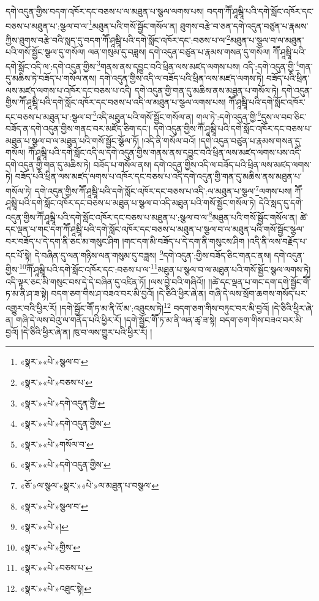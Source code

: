 དགེ་འདུན་གྱིས་བདག་འཁོར་དང་བཅས་པ་ལ་མཐུན་པ་སྩལ་ལགས་པས། བདག་ཀཽ་ཤཱམྦཱི་པའི་དགེ་སློང་འཁོར་དང་བཅས་པ་མཐུན་པ་:སྩལ་བ་ལ་\footnote{«སྣར་»«པེ་»སྩལ་བ་}མཐུན་པའི་གསོ་སྦྱོང་གསོལ་ན། ཐུགས་བརྩེ་བ་ཅན་དགེ་འདུན་བཙུན་པ་རྣམས་ཀྱིས་ཐུགས་བརྩེ་བའི་སླད་དུ་བདག་ཀཽ་ཤཱམྦཱི་པའི་དགེ་སློང་འཁོར་དང་:བཅས་པ་ལ་\footnote{«སྣར་»«པེ་»བཅས་པ་}མཐུན་པ་སྩལ་བ་ལ་མཐུན་པའི་གསོ་སྦྱོང་སྩལ་དུ་གསོལ། ལན་གསུམ་དུ་བཟླས། དགེ་འདུན་བཙུན་པ་རྣམས་གསན་དུ་གསོལ། ཀཽ་ཤཱམྦཱི་པའི་དགེ་སློང་འདི་ལ་:དགེ་འདུན་གྱིས་\footnote{«སྣར་»«པེ་»དགེ་འདུན་གྱི་}གནས་ནས་དབྱུང་བའི་ཕྲིན་ལས་མཛད་ལགས་པས། འདི་:དགེ་འདུན་གྱི་\footnote{«སྣར་»«པེ་»དགེ་འདུན་གྱིས་}གན་དུ་མཆིས་ཏེ་བཟོད་པ་གསོལ་ནས། དགེ་འདུན་གྱིས་འདི་ལ་བཟོད་པའི་ཕྲིན་ལས་མཛད་ལགས་ཏེ། བཟོད་པའི་ཕྲིན་ལས་མཛད་ལགས་པ་འཁོར་དང་བཅས་པ་འདི། དགེ་འདུན་གྱི་གན་དུ་མཆིས་ནས་མཐུན་པ་གསོལ་ཏེ། དགེ་འདུན་གྱིས་ཀཽ་ཤཱམྦཱི་པའི་དགེ་སློང་འཁོར་དང་བཅས་པ་འདི་ལ་མཐུན་པ་སྩལ་ལགས་པས། ཀཽ་ཤཱམྦཱི་པའི་དགེ་སློང་འཁོར་དང་བཅས་པ་མཐུན་པ་:སྩལ་བ་\footnote{«སྣར་»«པེ་»གསོལ་བ་}འདི་མཐུན་པའི་གསོ་སྦྱོང་གསོལ་ན། གལ་ཏེ་:དགེ་འདུན་གྱི་\footnote{«སྣར་»«པེ་»དགེ་འདུན་གྱིས་}དུས་ལ་བབ་ཅིང་བཟོད་ན་དགེ་འདུན་གྱིས་གནང་བར་མཛོད་ཅིག་དང་། དགེ་འདུན་གྱིས་ཀཽ་ཤཱམྦཱི་པའི་དགེ་སློང་འཁོར་དང་བཅས་པ་མཐུན་པ་སྩལ་བ་ལ་མཐུན་པའི་གསོ་སྦྱོང་སྩོལ་ཏོ། །འདི་ནི་གསོལ་བའོ། །དགེ་འདུན་བཙུན་པ་རྣམས་གསན་དུ་གསོལ། ཀཽ་ཤཱམྦཱི་པའི་དགེ་སློང་འདི་ལ་དགེ་འདུན་གྱིས་གནས་ནས་དབྱུང་བའི་ཕྲིན་ལས་མཛད་ལགས་པས་འདི་དགེ་འདུན་གྱི་གན་དུ་མཆིས་ཏེ། བཟོད་པ་གསོལ་ནས། དགེ་འདུན་གྱིས་འདི་ལ་བཟོད་པའི་ཕྲིན་ལས་མཛད་ལགས་ཏེ། བཟོད་པའི་ཕྲིན་ལས་མཛད་ལགས་པ་འཁོར་དང་བཅས་པ་འདི་དགེ་འདུན་གྱི་གན་དུ་མཆིས་ནས་མཐུན་པ་གསོལ་ཏེ། དགེ་འདུན་གྱིས་ཀཽ་ཤཱམྦཱི་པའི་དགེ་སློང་འཁོར་དང་བཅས་པ་འདི་:ལ་མཐུན་པ་སྩལ་\footnote{«ཅོ་»ལ་སྩལ་«སྣར་»«པེ་»ལ་མཐུན་པ་བསྩལ་}ལགས་པས། ཀཽ་ཤཱམྦཱི་པའི་དགེ་སློང་འཁོར་དང་བཅས་པ་མཐུན་པ་སྩལ་བ་འདི་མཐུན་པའི་གསོ་སྦྱོང་གསོལ་ཏེ། དེའི་སླད་དུ་དགེ་འདུན་གྱིས་ཀཽ་ཤཱམྦཱི་པའི་དགེ་སློང་འཁོར་དང་བཅས་པ་མཐུན་པ་:སྩལ་བ་ལ་\footnote{«སྣར་»«པེ་»སྩལ་བ་}མཐུན་པའི་གསོ་སྦྱོང་གསོལ་ན། ཚེ་དང་ལྡན་པ་གང་དག་ཀཽ་ཤཱམྦཱི་པའི་དགེ་སློང་འཁོར་དང་བཅས་པ་མཐུན་པ་སྩལ་བ་ལ་མཐུན་པའི་གསོ་སྦྱོང་སྩལ་བར་བཟོད་པ་དེ་དག་ནི་ཅང་མ་གསུང་ཤིག །གང་དག་མི་བཟོད་པ་དེ་དག་ནི་གསུངས་ཤིག །འདི་ནི་ལས་བརྗོད་པ་དང་པོ་སྟེ། དེ་བཞིན་དུ་ལན་གཉིས་ལན་གསུམ་དུ་བཟླས། \footnote{«སྣར་»«པེ་»།  }དགེ་འདུན་:གྱིས་བཟོད་ཅིང་གནང་ནས། དགེ་འདུན་གྱིས་\footnote{«སྣར་»«པེ་»གྱིས་}ཀཽ་ཤཱམྦཱི་པའི་དགེ་སློང་འཁོར་དང་:བཅས་པ་ལ་\footnote{«སྣར་»«པེ་»བཅས་པ་}མཐུན་པ་སྩལ་བ་ལ་མཐུན་པའི་གསོ་སྦྱོང་སྩལ་ལགས་ཏེ། འདི་ལྟར་ཅང་མི་གསུང་བས་དེ་དེ་བཞིན་དུ་འཛིན་ཏོ། །ལས་བྱེ་བའི་གཞིའོ།། །།ཚེ་དང་ལྡན་པ་གང་དག་དགེ་སྦྱོང་གཽ་ཏ་མ་ནི་ཤ་ཟ་སྟེ། བདག་ཅག་གིས་ཤ་བཟའ་བར་མི་བྱའོ། །དེ་ཅིའི་ཕྱིར་ཞེ་ན། གཞི་དེ་ལས་སྲོག་ཆགས་གསོད་པར་འགྱུར་བའི་ཕྱིར་རོ། །དགེ་སྦྱོང་གཽ་ཏ་མ་ནི་འོ་མ་:འཐུངས་ཏེ།\footnote{«སྣར་»«པེ་»འཐུང་སྟེ།} བདག་ཅག་གིས་བཏུང་བར་མི་བྱའོ། །དེ་ཅིའི་ཕྱིར་ཞེ་ན། གཞི་དེ་ལས་བེའུ་ལ་གནོད་པའི་ཕྱིར་རོ། །དགེ་སྦྱོང་གཽ་ཏ་མ་ནི་ལན་ཚྭ་ཟ་སྟེ། བདག་ཅག་གིས་བཟའ་བར་མི་བྱའོ། །དེ་ཅིའི་ཕྱིར་ཞེ་ན། ཁུ་བ་ལས་གྱུར་པའི་ཕྱིར་རོ། །

